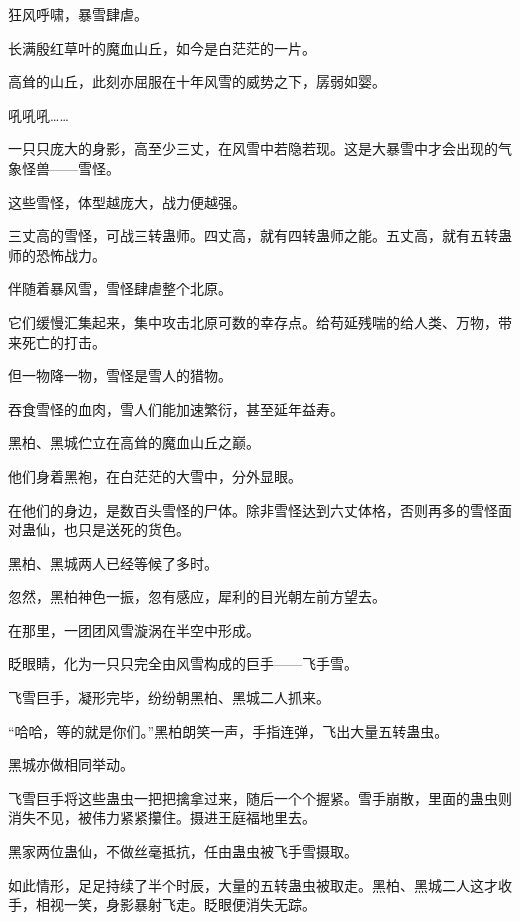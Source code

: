 
\begin{this_body}



狂风呼啸，暴雪肆虐。

长满殷红草叶的魔血山丘，如今是白茫茫的一片。

高耸的山丘，此刻亦屈服在十年风雪的威势之下，孱弱如婴。

吼吼吼……

一只只庞大的身影，高至少三丈，在风雪中若隐若现。这是大暴雪中才会出现的气象怪兽——雪怪。

这些雪怪，体型越庞大，战力便越强。

三丈高的雪怪，可战三转蛊师。四丈高，就有四转蛊师之能。五丈高，就有五转蛊师的恐怖战力。

伴随着暴风雪，雪怪肆虐整个北原。

它们缓慢汇集起来，集中攻击北原可数的幸存点。给苟延残喘的给人类、万物，带来死亡的打击。

但一物降一物，雪怪是雪人的猎物。

吞食雪怪的血肉，雪人们能加速繁衍，甚至延年益寿。

黑柏、黑城伫立在高耸的魔血山丘之巅。

他们身着黑袍，在白茫茫的大雪中，分外显眼。

在他们的身边，是数百头雪怪的尸体。除非雪怪达到六丈体格，否则再多的雪怪面对蛊仙，也只是送死的货色。

黑柏、黑城两人已经等候了多时。

忽然，黑柏神色一振，忽有感应，犀利的目光朝左前方望去。

在那里，一团团风雪漩涡在半空中形成。

眨眼睛，化为一只只完全由风雪构成的巨手——飞手雪。

飞雪巨手，凝形完毕，纷纷朝黑柏、黑城二人抓来。

“哈哈，等的就是你们。”黑柏朗笑一声，手指连弹，飞出大量五转蛊虫。

黑城亦做相同举动。

飞雪巨手将这些蛊虫一把把擒拿过来，随后一个个握紧。雪手崩散，里面的蛊虫则消失不见，被伟力紧紧攥住。摄进王庭福地里去。

黑家两位蛊仙，不做丝毫抵抗，任由蛊虫被飞手雪摄取。

如此情形，足足持续了半个时辰，大量的五转蛊虫被取走。黑柏、黑城二人这才收手，相视一笑，身影暴射飞走。眨眼便消失无踪。


\end{this_body}
